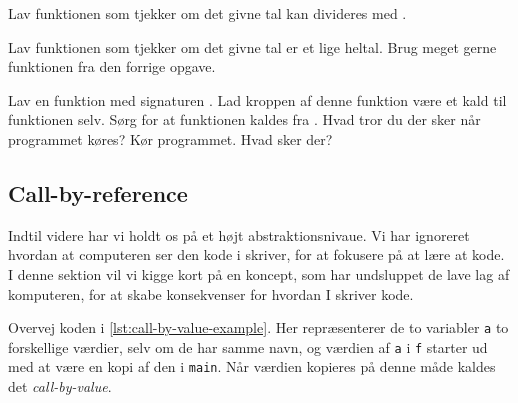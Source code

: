         \begin{exercise}
            Lav funktionen 
            som tjekker om det givne tal  kan
            divideres med .
        \end{exercise}

        \begin{exercise}
            Lav funktionen  som
            tjekker om det givne tal  er et lige
            heltal.  Brug meget gerne funktionen
             fra den forrige opgave.
        \end{exercise}

        \begin{exercise}
            Lav en funktion med signaturen . Lad
            kroppen af denne funktion være et kald til funktionen
            selv. Sørg for at funktionen kaldes fra .
            Hvad tror du der sker når programmet køres? Kør
            programmet. Hvad sker der?
        \end{exercise}

    \subsection{Call-by-reference}



        Indtil videre har vi holdt os på et højt abstraktionsnivaue.
        Vi har ignoreret hvordan at computeren ser den kode i skriver,
        for at fokusere på at lære at kode. I denne sektion vil vi
        kigge kort på en koncept, som har undsluppet de lave lag af
        komputeren, for at skabe konsekvenser for hvordan I skriver
        kode.

        Overvej koden i \autoref{lst:call-by-value-example}. Her
        repræsenterer de to variabler \texttt{a} to forskellige værdier,
        selv om de har samme navn, og værdien af \texttt{a} i \texttt{f}
        starter ud med at være en kopi af den i \texttt{main}. Når
        værdien kopieres på denne måde kaldes det
        \emph{call-by-value}.

